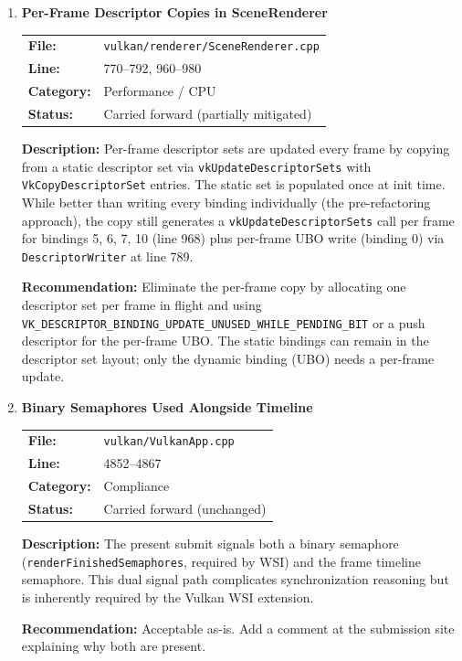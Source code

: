 \documentclass[a4paper,12pt]{article}
\newcommand{\severitybox}[2]{%
  \colorbox{#1}{\makebox[2.5cm][c]{\textcolor{white}{\textbf{#2}}}}%
}
\begin{document}
\begin{enumerate}[leftmargin=*]
\item[\textbf{[P5]}] \textbf{Per-Frame Descriptor Copies in SceneRenderer}
  \hfill \severitybox{mediumcolor}{MEDIUM}

  \begin{tabular}{ll}
    \textbf{File:} & \texttt{vulkan/renderer/SceneRenderer.cpp} \\
    \textbf{Line:} & 770--792, 960--980 \\
    \textbf{Category:} & Performance / CPU \\
    \textbf{Status:} & Carried forward (partially mitigated) \\
  \end{tabular}

  \textbf{Description:}
  Per-frame descriptor sets are updated every frame by copying from a static
  descriptor set via \texttt{vkUpdateDescriptorSets} with
  \texttt{VkCopyDescriptorSet} entries. The static set is populated once at
  init time. While better than writing every binding individually (the
  pre-refactoring approach), the copy still generates a
  \texttt{vkUpdateDescriptorSets} call per frame for bindings 5, 6, 7, 10
  (line 968) plus per-frame UBO write (binding 0) via \texttt{DescriptorWriter}
  at line 789.

  \textbf{Recommendation:}
  Eliminate the per-frame copy by allocating one descriptor set per frame in
  flight and using \texttt{VK\_DESCRIPTOR\_BINDING\_UPDATE\_UNUSED\_WHILE\_PENDING\_BIT}
  or a push descriptor for the per-frame UBO. The static bindings can remain
  in the descriptor set layout; only the dynamic binding (UBO) needs a
  per-frame update.

\item[\textbf{[C2]}] \textbf{Binary Semaphores Used Alongside Timeline}
  \hfill \severitybox{mediumcolor}{MEDIUM}

  \begin{tabular}{ll}
    \textbf{File:} & \texttt{vulkan/VulkanApp.cpp} \\
    \textbf{Line:} & 4852--4867 \\
    \textbf{Category:} & Compliance \\
    \textbf{Status:} & Carried forward (unchanged) \\
  \end{tabular}

  \textbf{Description:}
  The present submit signals both a binary semaphore (\texttt{renderFinishedSemaphores},
  required by WSI) and the frame timeline semaphore. This dual signal path
  complicates synchronization reasoning but is inherently required by the
  Vulkan WSI extension.

  \textbf{Recommendation:}
  Acceptable as-is. Add a comment at the submission site explaining why both
  are present.

\end{enumerate}
\end{document}

